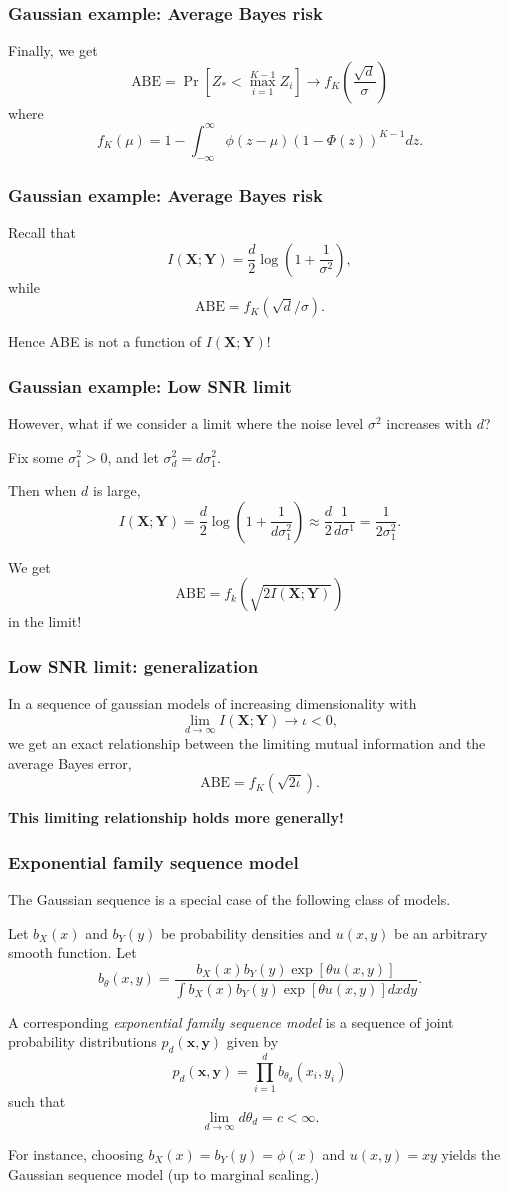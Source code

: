 \documentclass{beamer}
\newcommand{\bx}{\boldsymbol{x}}
\newcommand{\by}{\boldsymbol{y}}
\newcommand{\bX}{\boldsymbol{X}}
\newcommand{\bY}{\boldsymbol{Y}}
\begin{document}
\begin{frame}
\frametitle{Gaussian example: Average Bayes risk}
Finally, we get
\[
\text{ABE} = \Pr[Z_* < \max_{i=1}^{K-1} Z_i] \to f_K\left(\frac{\sqrt{d}}{\sigma}\right)
\]
where
\[
f_K(\mu) =  1 - \int_{-\infty}^\infty \phi(z-\mu) (1-\Phi(z))^{K-1} dz.
\]
\end{frame}

\begin{frame}
\frametitle{Gaussian example: Average Bayes risk}

Recall that
\[
I(\bX; \bY) =  \frac{d}{2}\log(1 + \frac{1}{\sigma^2}),
\]
while
\[
\text{ABE} = f_K(\sqrt{d}/\sigma).
\]

Hence ABE is not a function of $I(\bX; \bY)$!
\end{frame}


\begin{frame}
\frametitle{Gaussian example: Low SNR limit}
However, what if we consider a limit where the noise level $\sigma^2$ increases with $d$?

Fix some $\sigma^2_1 > 0$, and let $\sigma^2_d  = d \sigma^2_1$.

Then when $d$ is large,
\[
I(\bX; \bY) = \frac{d}{2}\log(1 + \frac{1}{d \sigma^2_1}) \approx \frac{d}{2}\frac{1}{d\sigma^1} = \frac{1}{2\sigma^2_1}.
\]

We get
\[
\text{ABE} = f_k(\sqrt{2 I(\bX; \bY)})
\]
in the limit!
\end{frame}

\begin{frame}
\frametitle{Low SNR limit: generalization}

In a sequence of gaussian models of increasing dimensionality with
\[
\lim_{d \to \infty} I(\bX; \bY) \to \iota < 0,
\]
we get an exact relationship between the limiting mutual information and the average Bayes error,
\[
\text{ABE} = f_K(\sqrt{2\iota}).
\]

\textbf{This limiting relationship holds more generally!}
\end{frame}

\begin{frame}
\frametitle{Exponential family sequence model}

The Gaussian sequence is a special case of the following class of models.

Let $b_X(x)$ and $b_Y(y)$ be probability densities and $u(x, y)$ be an arbitrary smooth function.
Let
\[
b_\theta(x, y) = \frac{b_X(x) b_Y(y) \exp[\theta u(x, y)]}{\int b_X(x) b_Y(y) \exp[\theta u(x, y)] dx dy}.
\]

A corresponding \emph{exponential family sequence model} is
a sequence of joint probability distributions $p_d(\bx, \by)$ given by
\[
p_d(\bx, \by) = \prod_{i=1}^d b_{\theta_d}(x_i, y_i)
\]
such that
\[
\lim_{d \to \infty} d\theta_d = c < \infty.
\]

For instance, choosing $b_X(x) = b_Y(y) = \phi(x)$ and $u(x, y) = xy$
yields the Gaussian sequence model (up to marginal scaling.)
\end{frame}
\end{document}
